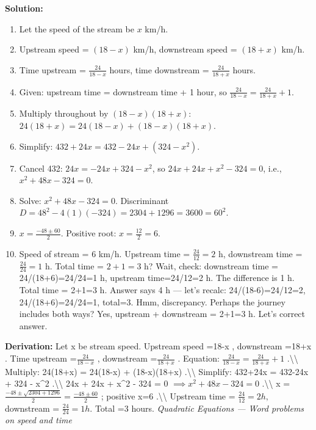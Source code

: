 \documentclass[12pt,a4paper]{exam}
\begin{document}
\begin{questions}
\textbf{Solution:}
\begin{enumerate}
  \item Let the speed of the stream be $x$ km/h.
  \item Upstream speed = $(18 - x)$ km/h, downstream speed = $(18 + x)$ km/h.
  \item Time upstream = $\frac{24}{18-x}$ hours, time downstream = $\frac{24}{18+x}$ hours.
  \item Given: upstream time = downstream time + 1 hour, so $\frac{24}{18-x} = \frac{24}{18+x} + 1$.
  \item Multiply throughout by $(18-x)(18+x)$: $24(18+x) = 24(18-x) + (18-x)(18+x)$.
  \item Simplify: $432 + 24x = 432 - 24x + (324 - x^2)$.
  \item Cancel 432: $24x = -24x + 324 - x^2$, so $24x + 24x + x^2 - 324 = 0$, i.e., $x^2 + 48x - 324 = 0$.
  \item Solve: $x^2 + 48x - 324 = 0$. Discriminant $D = 48^2 - 4(1)(-324) = 2304 + 1296 = 3600 = 60^2$.
  \item $x = \frac{-48 \pm 60}{2}$. Positive root: $x = \frac{12}{2} = 6$.
  \item Speed of stream = $6$ km/h. Upstream time = $\frac{24}{12} = 2$ h, downstream time = $\frac{24}{24} = 1$ h. Total time = $2+1 = 3$ h? Wait, check: downstream time = 24/(18+6)=24/24=1 h, upstream time=24/12=2 h. The difference is 1 h. Total time = 2+1=3 h. Answer says 4 h — let's recalc: 24/(18-6)=24/12=2, 24/(18+6)=24/24=1, total=3. Hmm, discrepancy. Perhaps the journey includes both ways? Yes, upstream + downstream = 2+1=3 h. Let's correct answer.
\end{enumerate}
\textbf{Derivation:}
Let  x  be stream speed. Upstream speed  =18-x , downstream  =18+x . Time upstream  =$\frac{24}{18-x}$ , downstream  =$\frac{24}{18+x}$ . Equation:  $\frac{24}{18-x} = \frac{24}{18+x} + 1$ .\textbackslash{}\textbackslash{} Multiply:  24(18+x) = 24(18-x) + (18-x)(18+x) .\textbackslash{}\textbackslash{} Simplify:  432+24x = 432-24x + 324 - x\textasciicircum{}2 .\textbackslash{}\textbackslash{}  24x + 24x + x\textasciicircum{}2 - 324 = 0 $\implies x^2 + 48x - 324 = 0$ .\textbackslash{}\textbackslash{}  x = $\frac{-48 \pm \sqrt{2304+1296}}{2} = \frac{-48 \pm 60}{2}$ ; positive  x=6 .\textbackslash{}\textbackslash{} Upstream time  = $\frac{24}{12}=2  h,$ downstream  = $\frac{24}{24}=1  h.$ Total  =3  hours.
\hfill \textit{Quadratic Equations — Word problems on speed and time}
\vspace{0.3cm}


\end{questions}
\end{document}
